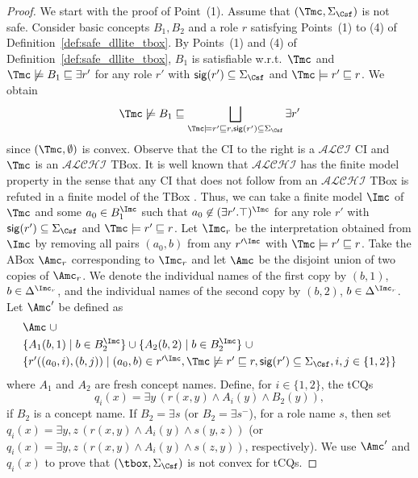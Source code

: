 \documentclass{lmcs}
\theoremstyle{definition}
\begin{document}
\begin{proof}
We start with the proof of Point~(1). Assume that $(\Tmc,\Sigma_{\Csf})$ is not safe.
Consider basic concepts $B_{1},B_{2}$ and a role $r$ satisfying Points~(1) to (4) of Definition~\ref{def:safe_dllite_tbox}. 
By Points~(1) and (4) of Definition~\ref{def:safe_dllite_tbox}, $B_{1}$ is satisfiable w.r.t.~$\Tmc$
and $\Tmc\not\models B_{1}\sqsubseteq \exists r'$ for any role $r'$ with ${\sf sig}(r')\subseteq \Sigma_{\Csf}$
and $\Tmc\models r'\sqsubseteq r$. We obtain
$$
\Tmc\not\models B_{1}\sqsubseteq \bigsqcup_{\Tmc\models r'\sqsubseteq r,{\sf sig}(r')\subseteq \Sigma_{\Csf}}\exists r'
$$ 
since $(\Tmc,\emptyset)$ is convex. Observe that the CI to the right is a $\mathcal{ALCI}$ CI and $\Tmc$ is an $\mathcal{ALCHI}$ TBox. It is well known that 
$\mathcal{ALCHI}$ has the finite model property in the sense that any CI that does not follow from an 
$\mathcal{ALCHI}$ TBox is refuted in a finite model of the TBox \cite{Baader-et-al-03b}. Thus, 
we can take a finite model $\Imc$ of $\Tmc$ and some $a_{0}\in B_{1}^{\Imc}$ such that $a_{0}\not\in (\exists r'.\top)^{\Imc}$ 
for any role $r'$ with ${\sf sig}(r')\subseteq \Sigma_\Csf$ and $\Tmc \models r'\sqsubseteq r$.  Let $\Imc_{r}$ be the
interpretation obtained from $\Imc$ by removing all pairs $(a_{0},b)$ from any $r'^{\Imc}$ with $\Tmc\models r'\sqsubseteq r$.
Take the ABox $\Amc_{r}$ corresponding to $\Imc_{r}$ and let $\Amc$ be the disjoint union of two copies of $\Amc_{r}$. 
We denote the individual names of the first copy by $(b,1)$, $b\in \Delta^{\Imc_{r}}$, and the individual names of the
second copy by $(b,2)$, $b\in \Delta^{\Imc_{r}}$. Let $\Amc'$ be defined as
$$
\begin{array}{l}
  \Amc \; \cup \\[1mm]
  \{ A_{1}(b,1)\mid b\in B_{2}^{\Imc}\} 
  \cup \{ A_{2}(b,2) \mid b\in B_{2}^{\Imc}\} \; \cup\\[1mm]
  \{r'((a_{0},i),(b,j))\mid (a_{0},b)\in r'^{\Imc},
  \Tmc \not\models r' \sqsubseteq r,
  {\sf sig}(r')\subseteq \Sigma_\Csf, i,j\in \{1,2\}\}
\end{array}
$$
where $A_{1}$ and $A_{2}$ are fresh concept names. Define, for 
$i\in\{1,2\}$, the tCQs
%
$$
  q_i(x) = \exists y \,(r(x,y) \wedge A_i(y) \wedge B_2 (y)),
$$
%
if $B_{2}$ is a concept name. If $B_{2}=\exists s$ (or $B_{2}=\exists s^{-}$), for a role name $s$, then 
set $q_{i}(x)=\exists y,z \,(r(x,y) \wedge A_i(y) \wedge s(y,z))$ (or $q_{i}(x)=\exists y,z \,(r(x,y) \wedge A_i(y) \wedge s(z,y))$, respectively).
We use $\Amc'$ and $q_{i}(x)$ to prove that $(\tbox,\Sigma_{\Csf})$ is not convex for tCQs.

\end{proof}
\end{document}
